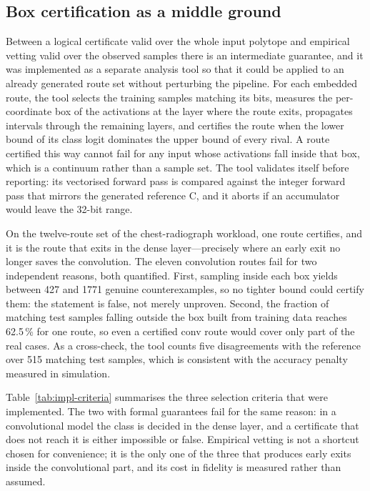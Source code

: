 \subsection{Box certification as a middle ground}

Between a logical certificate valid over the whole input polytope and empirical vetting valid over the observed samples there is an intermediate guarantee, and it was implemented as a separate analysis tool so that it could be applied to an already generated route set without perturbing the pipeline.
For each embedded route, the tool selects the training samples matching its bits, measures the per-coordinate box of the activations at the layer where the route exits, propagates intervals through the remaining layers, and certifies the route when the lower bound of its class logit dominates the upper bound of every rival.
A route certified this way cannot fail for any input whose activations fall inside that box, which is a continuum rather than a sample set.
The tool validates itself before reporting: its vectorised forward pass is compared against the integer forward pass that mirrors the generated reference C, and it aborts if an accumulator would leave the 32-bit range.

On the twelve-route set of the chest-radiograph workload, one route certifies, and it is the route that exits in the dense layer---precisely where an early exit no longer saves the convolution.
The eleven convolution routes fail for two independent reasons, both quantified.
First, sampling inside each box yields between 427 and 1771 genuine counterexamples, so no tighter bound could certify them: the statement is false, not merely unproven.
Second, the fraction of matching test samples falling outside the box built from training data reaches 62.5\,\% for one route, so even a certified conv route would cover only part of the real cases.
As a cross-check, the tool counts five disagreements with the reference over 515 matching test samples, which is consistent with the accuracy penalty measured in simulation.

Table~\ref{tab:impl-criteria} summarises the three selection criteria that were implemented.
The two with formal guarantees fail for the same reason: in a convolutional model the class is decided in the dense layer, and a certificate that does not reach it is either impossible or false.
Empirical vetting is not a shortcut chosen for convenience; it is the only one of the three that produces early exits inside the convolutional part, and its cost in fidelity is measured rather than assumed.


